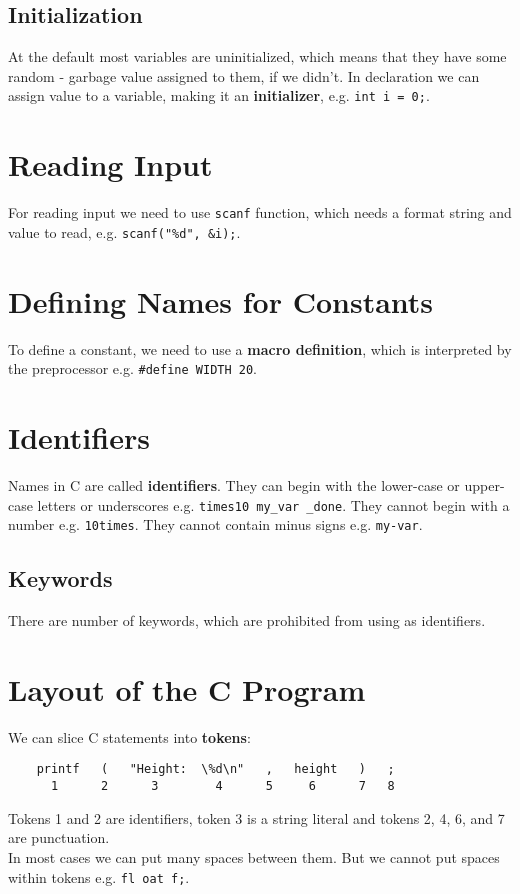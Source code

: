 \documentclass[12pt, openany]{book}
\begin{document}
    \subsection*{Initialization}
    At the default most variables are uninitialized, which means that they have some
    random - garbage value assigned to them, if we didn't. In declaration we can assign
    value to a variable, making it an \textbf{initializer}, e.g. \texttt{int i = 0;}.

    \section{Reading Input}
    For reading input we need to use \texttt{scanf} function, which needs a format
    string and value to read, e.g. \texttt{scanf("\%d", \&i);}.

    \section{Defining Names for Constants}
    To define a constant, we need to use a \textbf{macro definition}, which is
    interpreted by the preprocessor e.g. \texttt{\#define WIDTH 20}.

    \section{Identifiers}
    Names in C are called \textbf{identifiers}. They can begin with the lower-case or
    upper-case letters or underscores e.g. \texttt{times10  my\_var  \_done}. They
    cannot begin with a number e.g. \texttt{10times}. They cannot contain minus signs
    e.g. \texttt{my-var}.

    \subsection*{Keywords}
    There are number of keywords, which are prohibited from using as identifiers.

    \section{Layout of the C Program}
    We can slice C statements into \textbf{tokens}:
    \begin{lstlisting}
    printf   (   "Height:  \%d\n"   ,   height   )   ;
      1      2      3        4      5     6      7   8
    \end{lstlisting}
    Tokens 1 and 2 are identifiers, token 3 is a string literal and tokens 2, 4, 6,
     and 7 are punctuation. \\
    In most cases we can put many spaces between them. But we cannot put spaces within
    tokens e.g. \texttt{fl oat f;}. 
\end{document}
